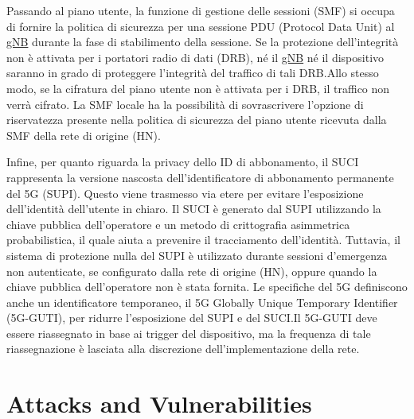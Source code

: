\documentclass[english]{article}
\begin{document}
Passando al piano utente, la funzione di gestione delle sessioni (SMF) si
occupa di fornire la politica di sicurezza per una sessione PDU (Protocol Data
Unit) al \hyperlink{gNB}{gNB} durante la fase di stabilimento della sessione.
Se la protezione dell'integrità non è attivata per i portatori radio di dati
(DRB), né il \hyperlink{gNB}{gNB} né il dispositivo saranno in grado di
proteggere l'integrità del traffico di tali DRB.\@ Allo stesso modo, se la
cifratura del piano utente non è attivata per i DRB, il traffico non verrà
cifrato. La SMF locale ha la possibilità di sovrascrivere l'opzione di
riservatezza presente nella politica di sicurezza del piano utente ricevuta
dalla SMF della rete di origine (HN).

Infine, per quanto riguarda la privacy dello ID di abbonamento, il SUCI
rappresenta la versione nascosta dell'identificatore di abbonamento permanente
del 5G (SUPI). Questo viene trasmesso via etere per evitare l'esposizione
dell'identità dell'utente in chiaro. Il SUCI è generato dal SUPI utilizzando la
chiave pubblica dell'operatore e un metodo di crittografia asimmetrica
probabilistica, il quale aiuta a prevenire il tracciamento dell'identità.
Tuttavia, il sistema di protezione nulla del SUPI è utilizzato durante sessioni
d'emergenza non autenticate, se configurato dalla rete di origine (HN), oppure
quando la chiave pubblica dell'operatore non è stata fornita. Le specifiche del
5G definiscono anche un identificatore temporaneo, il 5G Globally Unique
Temporary Identifier (5G-GUTI), per ridurre l'esposizione del SUPI e del
SUCI.\@ Il 5G-GUTI deve essere riassegnato in base ai trigger del dispositivo,
ma la frequenza di tale riassegnazione è lasciata alla discrezione
dell'implementazione della rete.

\section{Attacks and Vulnerabilities}\label{sec:5
}
\end{document}
